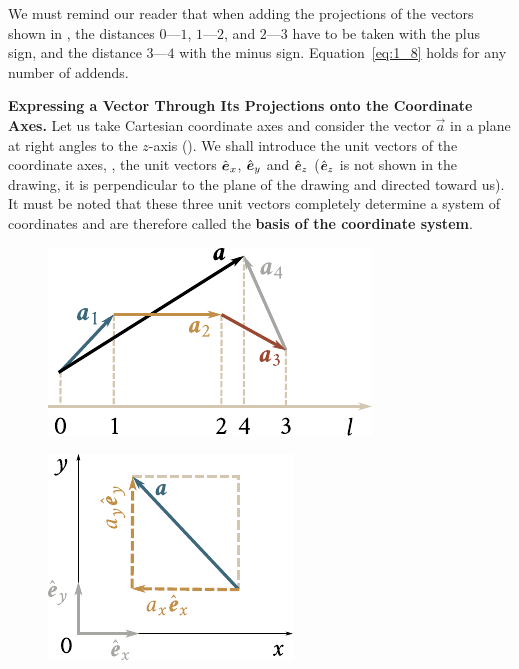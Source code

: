 \noindent
We must remind our reader that when adding the projections of the vectors shown in , the distances $0$---$1$, $1$---$2$, and $2$---$3$ have to be taken with the plus sign, and the distance $3$---$4$ with the minus sign. Equation~\eqref{eq:1_8} holds for any number of addends.

\textbf{Expressing a Vector Through Its Projections onto the Coordinate Axes.} Let us take Cartesian coordinate axes and consider the vector $\vec{a}$ in a plane at right angles to the $z$-axis (). We shall introduce the unit vectors of the coordinate axes, \ie, the unit vectors $\hat{\boldsymbol{e}}_{x}$, $\hat{\boldsymbol{e}}_{y}$ and $\hat{\boldsymbol{e}}_{z}$ ($\hat{\boldsymbol{e}}_{z}$ is not shown in the drawing, it is perpendicular to the plane of the drawing and directed toward us). It must be noted that these three unit vectors completely determine a system of coordinates and are therefore called the \textbf{basis of the coordinate system}.

\begin{figure}[t]
	\begin{minipage}[t]{0.5\linewidth}
		\begin{center}
			\includegraphics[scale=1]{figures/ch_01/fig_1_11.pdf}
			\caption[]{}
			\label{fig:1_11}
		\end{center}
	\end{minipage}
	\hfill{ }%
	\begin{minipage}[t]{0.5\linewidth}
		\begin{center}
			\includegraphics[scale=0.95]{figures/ch_01/fig_1_12.pdf}
			\caption[]{}
			\label{fig:1_12}
		\end{center}
	\end{minipage}
	\vspace{-0.8cm}
\end{figure}

